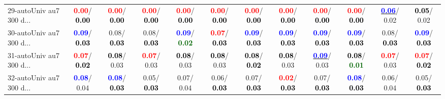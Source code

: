 \begin{table}[h]
\begin{center}
{\begin{tabular}{lc|c|c|c|c|c|c|c|c|c|c}
29-autoUniv au7 300 d... & \textcolor{red}{\textbf{  0.00}}/\textcolor{black}{\textbf{  0.00}} & \textcolor{red}{\textbf{  0.00}}/\textcolor{black}{\textbf{  0.00}} & \textcolor{red}{\textbf{  0.00}}/\textcolor{black}{\textbf{  0.00}} & \textcolor{red}{\textbf{  0.00}}/\textcolor{black}{\textbf{  0.00}} & \textcolor{red}{\textbf{  0.00}}/\textcolor{black}{\textbf{  0.00}} & \textcolor{red}{\textbf{  0.00}}/\textcolor{black}{\textbf{  0.00}} & \textcolor{red}{\textbf{  0.00}}/\textcolor{black}{\textbf{  0.00}} & \textcolor{red}{\textbf{  0.00}}/\textcolor{black}{\textbf{  0.00}} & \textcolor{red}{\textbf{  0.00}}/\textcolor{black}{\textbf{  0.00}} & \underline{\textcolor{blue}{\textbf{  0.06}}}/  0.02 & \textcolor{black}{\textbf{  0.05}}/  0.02 \\
30-autoUniv au7 300 d... & \textcolor{blue}{\textbf{  0.09}}/\textcolor{black}{\textbf{  0.03}} &   0.08/\textcolor{black}{\textbf{  0.03}} &   0.08/\textcolor{black}{\textbf{  0.03}} & \textcolor{blue}{\textbf{  0.09}}/\textcolor{darkgreen}{\textbf{  0.02}} & \textcolor{red}{\textbf{  0.07}}/\textcolor{black}{\textbf{  0.03}} & \textcolor{blue}{\textbf{  0.09}}/\textcolor{black}{\textbf{  0.03}} & \textcolor{blue}{\textbf{  0.09}}/\textcolor{black}{\textbf{  0.03}} & \textcolor{blue}{\textbf{  0.09}}/\textcolor{black}{\textbf{  0.03}} & \textcolor{blue}{\textbf{  0.09}}/\textcolor{black}{\textbf{  0.03}} &   0.08/\textcolor{black}{\textbf{  0.03}} & \textcolor{blue}{\textbf{  0.09}}/\textcolor{black}{\textbf{  0.03}} \\
31-autoUniv au7 300 d... & \textcolor{red}{\textbf{  0.07}}/\textcolor{black}{\textbf{  0.02}} & \textcolor{black}{\textbf{  0.08}}/  0.03 & \textcolor{red}{\textbf{  0.07}}/  0.03 & \textcolor{black}{\textbf{  0.08}}/  0.03 & \textcolor{black}{\textbf{  0.08}}/  0.03 & \textcolor{black}{\textbf{  0.08}}/\textcolor{black}{\textbf{  0.02}} & \textcolor{black}{\textbf{  0.08}}/  0.03 & \underline{\textcolor{blue}{\textbf{  0.09}}}/  0.03 & \textcolor{black}{\textbf{  0.08}}/\textcolor{darkgreen}{\textbf{  0.01}} & \textcolor{red}{\textbf{  0.07}}/  0.03 & \textcolor{red}{\textbf{  0.07}}/\textcolor{black}{\textbf{  0.02}} \\
32-autoUniv au7 300 d... & \textcolor{blue}{\textbf{  0.08}}/  0.04 & \textcolor{blue}{\textbf{  0.08}}/\textcolor{black}{\textbf{  0.03}} &   0.05/\textcolor{black}{\textbf{  0.03}} &   0.07/  0.04 &   0.06/\textcolor{black}{\textbf{  0.03}} &   0.07/\textcolor{black}{\textbf{  0.03}} & \textcolor{red}{\textbf{  0.02}}/\textcolor{black}{\textbf{  0.03}} &   0.07/\textcolor{black}{\textbf{  0.03}} & \textcolor{blue}{\textbf{  0.08}}/\textcolor{black}{\textbf{  0.03}} &   0.06/  0.04 &   0.05/\textcolor{black}{\textbf{  0.03}} \\\end{tabular}}\label{stratsALCKappa0AllReduxa}
\end{center}
\end{table}
